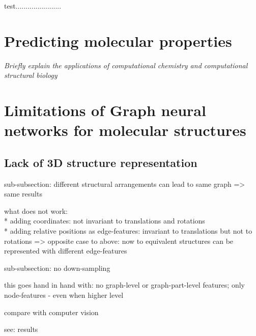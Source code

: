 test.......................



%
%


\section{Predicting molecular properties}

\textit{Briefly explain the applications of computational chemistry and computational structural biology} 


\section{Limitations of Graph neural networks for molecular structures}

\subsection{Lack of 3D structure representation}

{\itshape
	
sub-subsection: different structural arrangements can lead to same graph => same results

what does not work:\\
* adding coordinates: not invariant to translations and rotations\\
* adding relative positions as edge-features: invariant to translations but not to rotations
=> opposite case to above: now to equivalent structures can be represented with different edge-features

sub-subsection: no down-sampling

this goes hand in hand with: no graph-level or graph-part-level features; only node-features - even when higher level

compare with computer vision

see: results
	}
	
	


